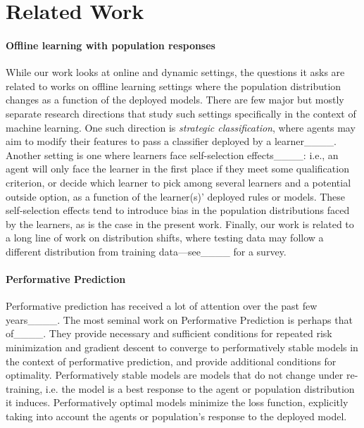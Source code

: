 \section{Related Work}

\paragraph{Offline learning with population responses} While our work looks at online and dynamic settings, the questions it asks are related to works on offline learning settings where the population distribution changes as a function of the deployed models. There are few major but mostly separate research directions that study such settings specifically in the context of machine learning. One such direction is \emph{strategic classification}, where agents may aim to modify their features to pass a classifier deployed by a learner____. Another setting is one where learners face self-selection effects____: i.e., an agent will only face the learner in the first place if they meet some qualification criterion, or decide which learner to pick among several learners and a potential outside option, as a function of the learner(s)' deployed rules or models. These self-selection effects tend to introduce bias in the population distributions faced by the learners, as is the case in the present work. Finally, our work is related to a long line of work on distribution shifts, where testing data may follow a different distribution from training data---see____ for a survey.

\paragraph{Performative Prediction} Performative prediction has received a lot of attention over the past few years____. The most seminal work on Performative Prediction is perhaps that of____. They provide necessary and sufficient conditions for repeated risk minimization and gradient descent to converge to performatively stable models in the context of performative prediction, and provide additional conditions for optimality. Performatively stable models are models that do not change under re-training, i.e. the model is a best response to the agent or population distribution it induces. Performatively optimal models minimize the loss function, explicitly taking into account the agents or population's response to the deployed model.

